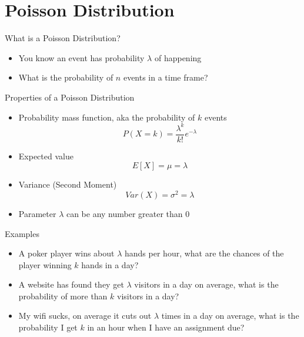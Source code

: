 \documentclass{beamer}
\begin{document}
\section{Poisson Distribution}
\begin{frame}{What is a Poisson Distribution?}
  \begin{itemize}
  \item You know an event has probability $\lambda$ of happening
  \item What is the probability of $n$ events in a time frame?
  \end{itemize}
\end{frame}
\begin{frame}{Properties of a Poisson Distribution}
    \begin{itemize}
  \item Probability mass function, aka the probability of $k$ events
    \begin{equation*}
      P(X=k)=\frac{\lambda^k}{k!}e^{-\lambda}
    \end{equation*}
  \item Expected value
    \begin{equation*}
      E[X]=\mu=\lambda
    \end{equation*}
  \item Variance (Second Moment)
    \begin{equation*}
      Var(X)=\sigma^2=\lambda
    \end{equation*}
  \item Parameter $\lambda$ can be any number greater than $0$
  \end{itemize}
\end{frame}
\begin{frame}{Examples}
  \begin{itemize}
  \item A poker player wins about $\lambda$ hands per hour, what are the chances of the player winning $k$ hands in a day?
  \item A website has found they get $\lambda$ visitors in a day on average, what is the probability of more than $k$ visitors in a day?
  \item My wifi sucks, on average it cuts out $\lambda$ times in a day on average, what is the probability I get $k$ in an hour when I have an assignment due?
  \end{itemize}
\end{frame}
\end{document}
